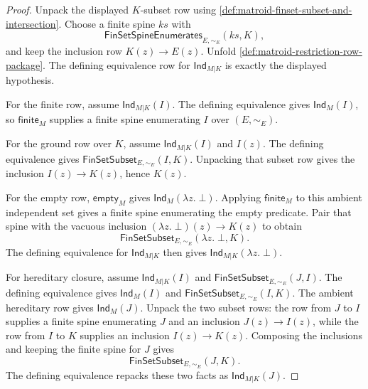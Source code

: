 \begin{proof}
Unpack the displayed $K$-subset row using \autoref{def:matroid-finset-subset-and-intersection}. Choose a finite spine $ks$ with
$$
\mathsf{FinSetSpineEnumerates}_{E,\sim_E}(ks,K),
$$
and keep the inclusion row $K(z)\to E(z)$. Unfold \autoref{def:matroid-restriction-row-package}. The defining equivalence row for $\mathsf{Ind}_{M|K}$ is exactly the displayed hypothesis.

For the finite row, assume $\mathsf{Ind}_{M|K}(I)$. The defining equivalence gives $\mathsf{Ind}_M(I)$, so $\mathsf{finite}_M$ supplies a finite spine enumerating $I$ over $(E,\sim_E)$.

For the ground row over $K$, assume $\mathsf{Ind}_{M|K}(I)$ and $I(z)$. The defining equivalence gives $\mathsf{FinSetSubset}_{E,\sim_E}(I,K)$. Unpacking that subset row gives the inclusion $I(z)\to K(z)$, hence $K(z)$.

For the empty row, $\mathsf{empty}_M$ gives $\mathsf{Ind}_M(\lambda z.\;\bot)$. Applying $\mathsf{finite}_M$ to this ambient independent set gives a finite spine enumerating the empty predicate. Pair that spine with the vacuous inclusion $(\lambda z.\;\bot)(z)\to K(z)$ to obtain
$$
\mathsf{FinSetSubset}_{E,\sim_E}(\lambda z.\;\bot,K).
$$
The defining equivalence for $\mathsf{Ind}_{M|K}$ then gives $\mathsf{Ind}_{M|K}(\lambda z.\;\bot)$.

For hereditary closure, assume $\mathsf{Ind}_{M|K}(I)$ and $\mathsf{FinSetSubset}_{E,\sim_E}(J,I)$. The defining equivalence gives $\mathsf{Ind}_M(I)$ and $\mathsf{FinSetSubset}_{E,\sim_E}(I,K)$. The ambient hereditary row gives $\mathsf{Ind}_M(J)$. Unpack the two subset rows: the row from $J$ to $I$ supplies a finite spine enumerating $J$ and an inclusion $J(z)\to I(z)$, while the row from $I$ to $K$ supplies an inclusion $I(z)\to K(z)$. Composing the inclusions and keeping the finite spine for $J$ gives
$$
\mathsf{FinSetSubset}_{E,\sim_E}(J,K).
$$
The defining equivalence repacks these two facts as $\mathsf{Ind}_{M|K}(J)$.


\end{proof}
